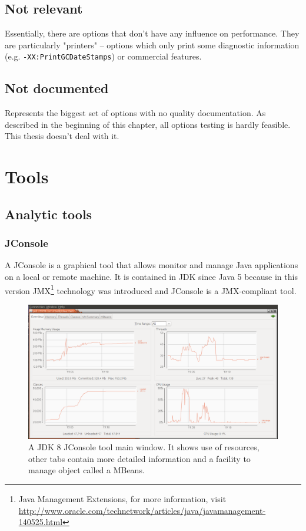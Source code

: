 \documentclass[
  digital, %
  oneside,
  notable, %
  nolof,     %
  nolot     %
]{fithesis3}
\begin{document}
\section{Not relevant}
Essentially, there are options that don't have any influence on performance. They are particularly "printers" -- options which only print some diagnostic information (e.g. \texttt{-XX:PrintGCDateStamps}) or commercial features.

\section{Not documented}
Represents the biggest set of options with no quality documentation. As described in the beginning of this chapter, all options testing is hardly feasible. This thesis doesn't deal with it.

\chapter{Tools}

\section{Analytic tools}
\subsection{JConsole}
A JConsole is a graphical tool that allows monitor and manage Java applications on a local or remote machine. It is contained in JDK since Java 5 because in this version JMX\footnote{Java Management Extensions, for more information, visit \url{http://www.oracle.com/technetwork/articles/java/javamanagement-140525.html}} technology was introduced and JConsole is a JMX-compliant tool.~\cite{jconsole}

\begin{figure}[h]
	\centering
	\includegraphics[width=13cm]{fig/jconsole.png}
	\caption{A JDK 8 JConsole tool main window. It shows use of resources, other tabs contain more detailed information and a facility to manage object called a MBeans.}
	\label{jconsole}
\end{figure}
\end{document}
